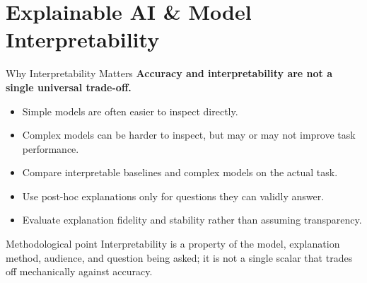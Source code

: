 %
%

\section{Explainable AI \& Model Interpretability}


\begin{frame}{Why Interpretability Matters}
\textbf{Accuracy and interpretability are not a single universal trade-off.}

\begin{itemize}
  \item Simple models are often easier to inspect directly.
  \item Complex models can be harder to inspect, but may or may not improve task performance.
  \item Compare interpretable baselines and complex models on the actual task.
  \item Use post-hoc explanations only for questions they can validly answer.
  \item Evaluate explanation fidelity and stability rather than assuming transparency.
\end{itemize}

\begin{alertblock}{Methodological point}
Interpretability is a property of the model, explanation method, audience, and question being asked; it is not a single scalar that trades off mechanically against accuracy.
\end{alertblock}
\end{frame}

